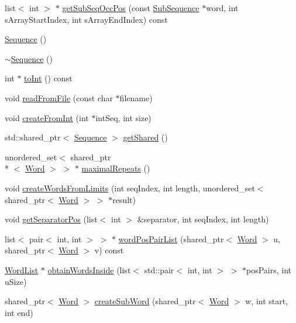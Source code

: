 \begin{DoxyCompactItemize}
\item 
list$<$ int $>$ $\ast$ \hyperlink{classSequence_a56c3dbd041ff758d1a2a0038c5ff4f43}{get\-Sub\-Seq\-Occ\-Pos} (const \hyperlink{classSubSequence}{Sub\-Sequence} $\ast$word, int s\-Array\-Start\-Index, int s\-Array\-End\-Index) const 
\item 
\hyperlink{classSequence_a532b7e8df6ff6b2f990c14ae97859ca2}{Sequence} ()
\item 
\hyperlink{classSequence_aee09a7d70c3ab523fed85da94ea1366f}{$\sim$\-Sequence} ()
\item 
int $\ast$ \hyperlink{classSequence_ac927b7e0d44e24a36014049a1d815971}{to\-Int} () const 
\item 
void \hyperlink{classSequence_a68148169be761cee0ab894e8a8926c43}{read\-From\-File} (const char $\ast$filename)
\item 
void \hyperlink{classSequence_a6902e3c6c47765dc91459f7df6234f33}{create\-From\-Int} (int $\ast$int\-Seq, int size)
\item 
std\-::shared\-\_\-ptr$<$ \hyperlink{classSequence}{Sequence} $>$ \hyperlink{classSequence_a116435038379ccab4e9f07d771e73235}{get\-Shared} ()
\item 
unordered\-\_\-set$<$ shared\-\_\-ptr\\*
$<$ \hyperlink{classWord}{Word} $>$ $>$ $\ast$ \hyperlink{classSequence_aee9c79f037c7638c637b1f851e6ec4a5}{maximal\-Repeats} ()
\item 
void \hyperlink{classSequence_aabde519f0689f9efa795f6a5c3d9416c}{create\-Words\-From\-Limits} (int seq\-Index, int length, unordered\-\_\-set$<$ shared\-\_\-ptr$<$ \hyperlink{classWord}{Word} $>$ $>$ $\ast$result)
\item 
void \hyperlink{classSequence_aedb4310b1b31e7b5866f40ce375dfe47}{get\-Separator\-Pos} (list$<$ int $>$ \&separator, int seq\-Index, int length)
\item 
list$<$ pair$<$ int, int $>$ $>$ $\ast$ \hyperlink{classSequence_af23046c26b6a8655bd98680f6f411f4a}{word\-Pos\-Pair\-List} (shared\-\_\-ptr$<$ \hyperlink{classWord}{Word} $>$ u, shared\-\_\-ptr$<$ \hyperlink{classWord}{Word} $>$ v) const 
\item 
\hyperlink{classWordList}{Word\-List} $\ast$ \hyperlink{classSequence_aa2e4d06d869c20f6b867c95d5e799c6b}{obtain\-Words\-Inside} (list$<$ std\-::pair$<$ int, int $>$ $>$ $\ast$pos\-Pairs, int u\-Size)
\item 
shared\-\_\-ptr$<$ \hyperlink{classWord}{Word} $>$ \hyperlink{classSequence_a4a48347d3684b23c75f92511256022e6}{create\-Sub\-Word} (shared\-\_\-ptr$<$ \hyperlink{classWord}{Word} $>$ w, int start, int end)

\end{DoxyCompactItemize}
